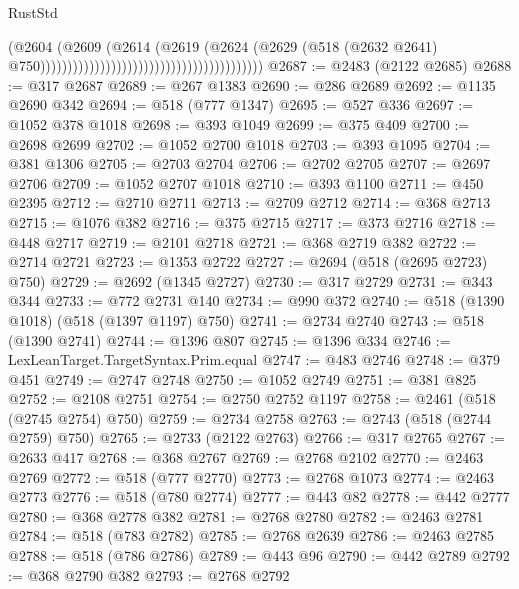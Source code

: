 \begin{lexlean}{RustStd}
\begin{coremodule}
{\begin{coremodule}
{{{{{{{{{{{{{{{{{{{{{{{{{{{{{{{{{{{{{{{{{{{{{{{{{{                                                                        (@2604
                                                                          (@2609
                                                                            (@2614
                                                                              (@2619
                                                                                (@2624
                                                                                  (@2629
                                                                                    (@518
                                                                                      (@2632 @2641)
                                                                                      @750)))))))))))))))))))))))))))))))))))))))))
@2687 := @2483 (@2122 @2685)
@2688 := @317 @2687
@2689 := @267 @1383
@2690 := @286 @2689
@2692 := @1135 @2690 @342
@2694 := @518 (@777 @1347)
@2695 := @527 @336
@2697 := @1052 @378 @1018
@2698 := @393 @1049
@2699 := @375 @409
@2700 := @2698 @2699
@2702 := @1052 @2700 @1018
@2703 := @393 @1095
@2704 := @381 @1306
@2705 := @2703 @2704
@2706 := @2702 @2705
@2707 := @2697 @2706
@2709 := @1052 @2707 @1018
@2710 := @393 @1100
@2711 := @450 @2395
@2712 := @2710 @2711
@2713 := @2709 @2712
@2714 := @368 @2713
@2715 := @1076 @382
@2716 := @375 @2715
@2717 := @373 @2716
@2718 := @448 @2717
@2719 := @2101 @2718
@2721 := @368 @2719 @382
@2722 := @2714 @2721
@2723 := @1353 @2722
@2727 := @2694 (@518 (@2695 @2723) @750)
@2729 := @2692 (@1345 @2727)
@2730 := @317 @2729
@2731 := @343 @344
@2733 := @772 @2731 @140
@2734 := @990 @372
@2740 := @518 (@1390 @1018) (@518 (@1397 @1197) @750)
@2741 := @2734 @2740
@2743 := @518 (@1390 @2741)
@2744 := @1396 @807
@2745 := @1396 @334
@2746 := LexLeanTarget.TargetSyntax.Prim.equal
@2747 := @483 @2746
@2748 := @379 @451
@2749 := @2747 @2748
@2750 := @1052 @2749
@2751 := @381 @825
@2752 := @2108 @2751
@2754 := @2750 @2752 @1197
@2758 := @2461 (@518 (@2745 @2754) @750)
@2759 := @2734 @2758
@2763 := @2743 (@518 (@2744 @2759) @750)
@2765 := @2733 (@2122 @2763)
@2766 := @317 @2765
@2767 := @2633 @417
@2768 := @368 @2767
@2769 := @2768 @2102
@2770 := @2463 @2769
@2772 := @518 (@777 @2770)
@2773 := @2768 @1073
@2774 := @2463 @2773
@2776 := @518 (@780 @2774)
@2777 := @443 @82
@2778 := @442 @2777
@2780 := @368 @2778 @382
@2781 := @2768 @2780
@2782 := @2463 @2781
@2784 := @518 (@783 @2782)
@2785 := @2768 @2639
@2786 := @2463 @2785
@2788 := @518 (@786 @2786)
@2789 := @443 @96
@2790 := @442 @2789
@2792 := @368 @2790 @382
@2793 := @2768 @2792
}}}}}}}}}}}}}}}}}}}}}}}}}}}}}}}}}}}}}}}}}}}}}}}}}}
\end{coremodule}}
\end{coremodule}
\end{lexlean}
